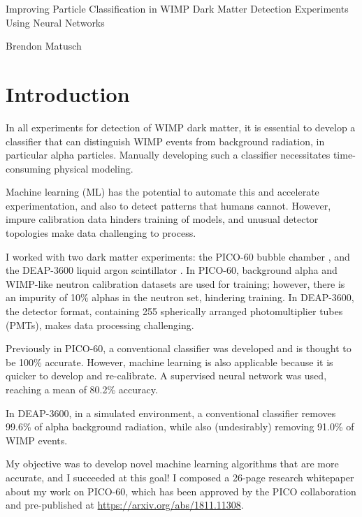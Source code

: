 \documentclass[12pt]{article}
\begin{document}
\begin{center}
    \begin{LARGE}
        Improving Particle Classification in WIMP Dark Matter Detection Experiments Using Neural Networks
    \end{LARGE}

    Brendon Matusch
\end{center}

\section{Introduction}

In all experiments for detection of WIMP dark matter, it is essential to develop a classifier that can distinguish WIMP events from background radiation, in particular alpha particles. Manually developing such a classifier necessitates time-consuming physical modeling.

Machine learning (ML) has the potential to automate this and accelerate experimentation, and also to detect patterns that humans cannot. However, impure calibration data hinders training of models, and unusual detector topologies make data challenging to process.

I worked with two dark matter experiments: the PICO-60 bubble chamber \cite{pico}, and the DEAP-3600 liquid argon scintillator \cite{deap}. In PICO-60, background alpha and WIMP-like neutron calibration datasets are used for training; however, there is an impurity of 10\% alphas in the neutron set, hindering training. In DEAP-3600, the detector format, containing 255 spherically arranged photomultiplier tubes (PMTs), makes data processing challenging.

Previously in PICO-60, a conventional classifier was developed and is thought to be 100\% accurate. However, machine learning is also applicable because it is quicker to develop and re-calibrate. A supervised neural network was used, reaching a mean of 80.2\% accuracy.

In DEAP-3600, in a simulated environment, a conventional classifier removes 99.6\% of alpha background radiation, while also (undesirably) removing 91.0\% of WIMP events.

My objective was to develop novel machine learning algorithms that are more accurate, and I succeeded at this goal! I composed a 26-page research whitepaper \cite{me} about my work on PICO-60, which has been approved by the PICO collaboration and pre-published at \url{https://arxiv.org/abs/1811.11308}.
\end{document}
